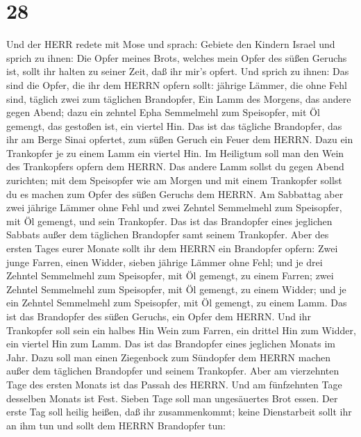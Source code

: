 \hypertarget{section-27}{%
\section{28}\label{section-27}}

 Und der HERR redete mit Mose und sprach: 
Gebiete den Kindern Israel und sprich zu ihnen: Die Opfer meines Brots,
welches mein Opfer des süßen Geruchs ist, sollt ihr halten zu seiner
Zeit, daß ihr mir's opfert.  Und sprich zu ihnen: Das sind
die Opfer, die ihr dem HERRN opfern sollt: jährige Lämmer, die ohne Fehl
sind, täglich zwei zum täglichen Brandopfer,  Ein Lamm des
Morgens, das andere gegen Abend;  dazu ein zehntel Epha
Semmelmehl zum Speisopfer, mit Öl gemengt, das gestoßen ist, ein viertel
Hin.  Das ist das tägliche Brandopfer, das ihr am Berge
Sinai opfertet, zum süßen Geruch ein Feuer dem HERRN.  Dazu
ein Trankopfer je zu einem Lamm ein viertel Hin. Im Heiligtum soll man
den Wein des Trankopfers opfern dem HERRN.  Das andere Lamm
sollst du gegen Abend zurichten; mit dem Speisopfer wie am Morgen und
mit einem Trankopfer sollst du es machen zum Opfer des süßen Geruchs dem
HERRN.  Am Sabbattag aber zwei jährige Lämmer ohne Fehl und
zwei Zehntel Semmelmehl zum Speisopfer, mit Öl gemengt, und sein
Trankopfer.  Das ist das Brandopfer eines jeglichen Sabbats
außer dem täglichen Brandopfer samt seinem Trankopfer. 
Aber des ersten Tages eurer Monate sollt ihr dem HERRN ein Brandopfer
opfern: Zwei junge Farren, einen Widder, sieben jährige Lämmer ohne
Fehl;  und je drei Zehntel Semmelmehl zum Speisopfer, mit
Öl gemengt, zu einem Farren; zwei Zehntel Semmelmehl zum Speisopfer, mit
Öl gemengt, zu einem Widder;  und je ein Zehntel Semmelmehl
zum Speisopfer, mit Öl gemengt, zu einem Lamm. Das ist das Brandopfer
des süßen Geruchs, ein Opfer dem HERRN.  Und ihr Trankopfer
soll sein ein halbes Hin Wein zum Farren, ein drittel Hin zum Widder,
ein viertel Hin zum Lamm. Das ist das Brandopfer eines jeglichen Monats
im Jahr.  Dazu soll man einen Ziegenbock zum Sündopfer dem
HERRN machen außer dem täglichen Brandopfer und seinem Trankopfer.
 Aber am vierzehnten Tage des ersten Monats ist das Passah
des HERRN.  Und am fünfzehnten Tage desselben Monats ist
Fest. Sieben Tage soll man ungesäuertes Brot essen.  Der
erste Tag soll heilig heißen, daß ihr zusammenkommt; keine Dienstarbeit
sollt ihr an ihm tun  und sollt dem HERRN Brandopfer tun:
